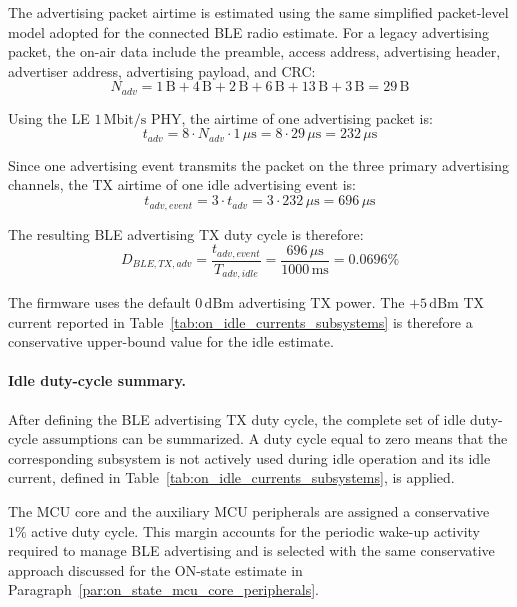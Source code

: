 The advertising packet airtime is estimated using the same simplified packet-level model adopted for the connected BLE radio estimate. 
For a legacy advertising packet, the on-air data include the preamble, access address, advertising header, advertiser address, advertising payload, and CRC:
\begin{equation}
	N_{adv} = 1\,\mathrm{B} + 4\,\mathrm{B} + 2\,\mathrm{B} + 6\,\mathrm{B} + 13\,\mathrm{B} + 3\,\mathrm{B}
	= 29\,\mathrm{B}
\end{equation}

Using the LE \(1\,\mathrm{Mbit/s}\) PHY, the airtime of one advertising packet is:
\begin{equation}
	t_{adv} = 8 \cdot N_{adv} \cdot 1\,\mu\mathrm{s}
	= 8 \cdot 29\,\mu\mathrm{s}
	= 232\,\mu\mathrm{s}
\end{equation}

Since one advertising event transmits the packet on the three primary advertising channels, the TX airtime of one idle advertising event is:
\begin{equation}
	t_{adv,event} = 3 \cdot t_{adv}
	= 3 \cdot 232\,\mu\mathrm{s}
	= 696\,\mu\mathrm{s}
\end{equation}

The resulting BLE advertising TX duty cycle is therefore:
\begin{equation}
	\label{eq:idle_ble_adv_duty}
	D_{BLE,TX,adv} = \frac{t_{adv,event}}{T_{adv,idle}}
	= \frac{696\,\mu\mathrm{s}}{1000\,\mathrm{ms}}
	= 0.0696\%
\end{equation}

The firmware uses the default \(0\,\mathrm{dBm}\) advertising TX power. 
The \(+5\,\mathrm{dBm}\) TX current reported in Table~\ref{tab:on_idle_currents_subsystems} is therefore a conservative upper-bound value for the idle estimate.


\paragraph{Idle duty-cycle summary.}
After defining the BLE advertising TX duty cycle, the complete set of idle duty-cycle assumptions can be summarized. 
A duty cycle equal to zero means that the corresponding subsystem is not actively used during idle operation and its idle current, defined in Table~\ref{tab:on_idle_currents_subsystems}, is applied.

The MCU core and the auxiliary MCU peripherals are assigned a conservative \(1\%\) active duty cycle. 
This margin accounts for the periodic wake-up activity required to manage BLE advertising and is selected with the same conservative approach discussed for the ON-state estimate in Paragraph~\ref{par:on_state_mcu_core_peripherals}.

